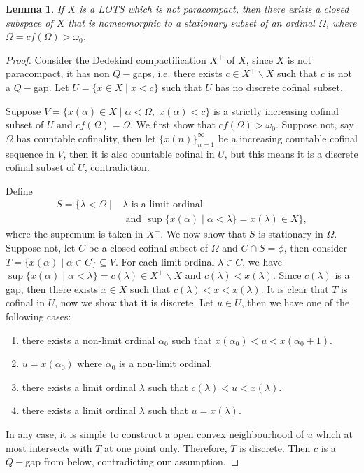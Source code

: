 \documentclass[12pt,oneside,english]{amsbook}
\numberwithin{equation}{section} %
\numberwithin{figure}{section} %
\theoremstyle{plain}
\numberwithin{section}{chapter}
\theoremstyle{plain}
\newtheorem{lem}[thm]{Lemma}
\begin{document}
\begin{lem} \label{lem:paracompact:stationary:4}
  If $X$ is a LOTS which is not paracompact, then there exists a closed subspace of $X$ that is homeomorphic to a stationary subset of an ordinal $\Omega$, where $\Omega = cf(\Omega) > \omega_{0}$.
\end{lem}

\begin{proof}
  Consider the Dedekind compactification $X^+$ of $X$, since $X$ is not paracompact, it has non $Q-$gaps, i.e. there exists $c \in X^+ \backslash X$ such that $c$ is not a $Q-$gap. Let $U = \{ x \in X \; | \; x < c \}$ such that $U$ has no discrete cofinal subset.

  Suppose $V = \{ x(\alpha) \in X \; | \; \alpha < \Omega, \; x(\alpha) < c \}$ is a strictly increasing cofinal subset of $U$ and $cf(\Omega) = \Omega$. We first show that $cf(\Omega) > \omega_{0}$. Suppose not, say $\Omega$ has countable cofinality, then let $\{x(n)\}_{n = 1}^{\infty}$ be a increasing countable cofinal sequence in $V$, then it is also countable cofinal in $U$, but this means it is a discrete cofinal subset of $U$, contradiction.

  Define
  \begin{align*}
    S = \{\lambda < \Omega \; | \; & \lambda \text{ is a limit ordinal} \\
     & \text{ and } \sup{\{x(\alpha) \; | \; \alpha < \lambda \}} = x(\lambda) \in X \},
  \end{align*}
  where the supremum is taken in $X^+$. We now show that $S$ is stationary in $\Omega$. Suppose not, let $C$ be a closed cofinal subset of $\Omega$ and $C \cap S = \phi$, then consider $T = \{ x(\alpha) \; | \; \alpha \in C \} \subseteq V$. For each limit ordinal $\lambda \in C$, we have $\sup{\{x(\alpha) \; | \; \alpha < \lambda \}} = c(\lambda) \in X^+ \backslash X$ and $c(\lambda) < x(\lambda)$. Since $c(\lambda)$ is a gap, then there exists $x \in X$ such that $c(\lambda) < x < x(\lambda)$. It is clear that $T$ is cofinal in $U$, now we show that it is discrete. Let $u \in U$, then we have one of the following cases:
    \begin{enumerate}
    \item there exists a non-limit ordinal $\alpha_{0}$ such that $ x(\alpha_{0}) < u < x(\alpha_{0}+1)$.
    \item $u = x(\alpha_{0})$ where $\alpha_{0}$ is a non-limit ordinal.
    \item there exists a limit ordinal $\lambda$ such that $c(\lambda) < u < x(\lambda)$.
    \item there exists a limit ordinal $\lambda$ such that $u = x(\lambda)$.
    \end{enumerate}
    In any case, it is simple to construct a open convex neighbourhood of $u$ which at most intersects with $T$ at one point only. Therefore, $T$ is discrete. Then $c$ is a $Q-$gap from below, contradicting our assumption.


\end{proof}
\end{document}
